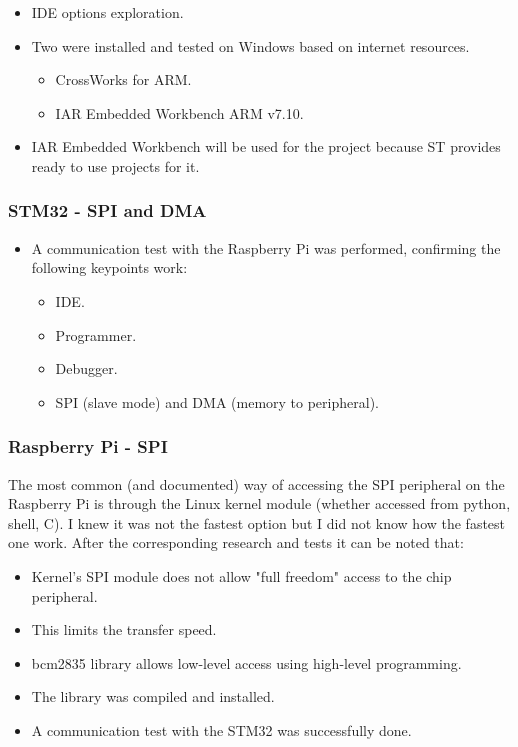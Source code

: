 \begin{itemize}
	\item IDE options exploration.
	\item Two were installed and tested on Windows based on internet resources.
	\begin{itemize}
		\item CrossWorks for ARM.
		\item IAR Embedded Workbench ARM v7.10.
	\end{itemize}
	\item IAR Embedded Workbench will be used for the project because ST provides ready to use projects for it.
\end{itemize}


\subsubsection{STM32 - SPI and DMA}
\begin{itemize}
	\item A communication test with the Raspberry Pi was performed, confirming the following keypoints work:
	\begin{itemize}
		\item IDE.
		\item Programmer.
		\item Debugger.
		\item SPI (slave mode) and DMA (memory to peripheral).
	\end{itemize}
\end{itemize}



\subsubsection{Raspberry Pi - SPI}

The most common (and documented) way of accessing the SPI peripheral on the Raspberry Pi is through the Linux kernel module (whether accessed from python, shell, C). I knew it was not the fastest option but I did not know how the fastest one work. After the corresponding research and tests it can be noted that:

\begin{itemize}
	\item Kernel's SPI module does not allow "full freedom" access to the chip peripheral.
	\item This limits the transfer speed.
	\item bcm2835 library allows low-level access using high-level programming.
	\item The library was compiled and installed.
	\item A communication test with the STM32 was successfully done.
\end{itemize}


